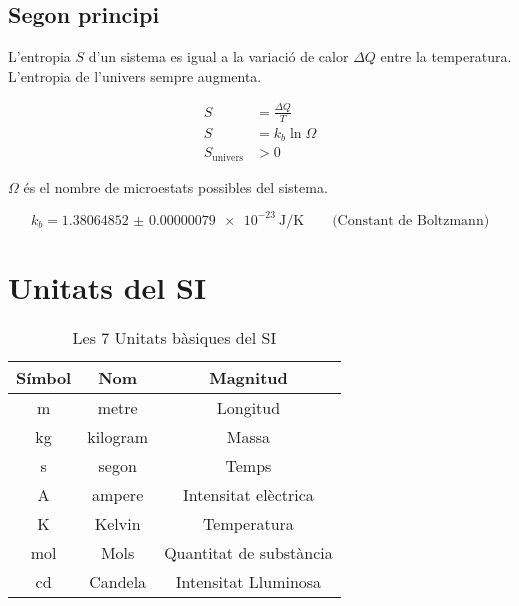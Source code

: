 \subsection{Segon principi}
\label{sub:segon_principi}

L'entropia $S$ d'un sistema es igual a la variació de calor $\Delta Q$ entre la
temperatura. L'entropia de l'univers sempre augmenta.

\begin{align}
    S &= \frac{\Delta Q}{T} \\
    S &= k_b \ln \Omega \\
    S_\text{univers} &> 0
\end{align}

$\Omega$ és el nombre de microestats possibles del sistema.

\begin{equation}
    k_b =  \SI{1.38064852(79)e-23}{\joule\per\kelvin} \qquad \text{(Constant de Boltzmann)}
\end{equation}

\section{Unitats del SI}
\label{sec:unitats_del_si}

\begin{table}[H]
    \centering
    \caption{Les 7 Unitats bàsiques del SI}
    \label{tab:si_unitats_basiques}
    \begin{tabular}{ccc}
        \toprule
        Símbol  &   Nom     &   Magnitud \\
        \midrule
        \si{\metre}     & metre     & Longitud \\
        \si{\kilo\gram} & kilogram  & Massa\\
        \si{\second}    & segon     & Temps \\
        \si{\ampere}    & ampere    & Intensitat elèctrica \\
        \si{\kelvin}    & Kelvin    & Temperatura \\
        \si{\mol}       & Mols      & Quantitat de substància\\
        \si{\candela}   & Candela   & Intensitat Lluminosa\\

        \bottomrule

    \end{tabular}
\end{table}

